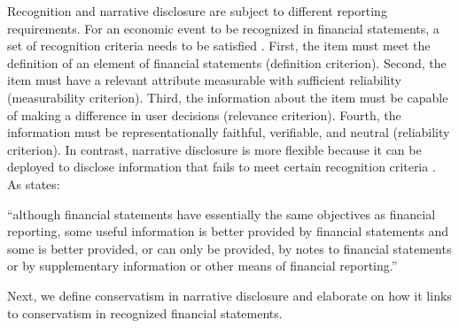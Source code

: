 \documentclass[letterpaper,12pt]{article}
\begin{document}
\begin{spacing}{1.5}
Recognition and narrative disclosure are subject to different reporting requirements. For an economic event to be recognized in financial statements, a set of recognition criteria needs to be satisfied \cite{fasbStatementFinancialAccounting1984}. First, the item must meet the definition of an element of financial statements (definition criterion). Second, the item must have a relevant attribute measurable with sufficient reliability (measurability criterion). Third, the information about the item must be capable of making a difference in user decisions (relevance criterion). Fourth, the information must be representationally faithful, verifiable, and neutral (reliability criterion). In contrast, narrative disclosure is more flexible because it can be deployed to disclose information that fails to meet certain recognition criteria \cite[par. 7b]{fasbStatementFinancialAccounting1984}. As  states:
\begin{adjustwidth}{0.8cm}{0.4cm}
	\begin{singlespace}
		``although financial statements have essentially the same objectives as financial reporting, some useful information is better provided by financial statements and some is better provided, or can only be provided, by notes to financial statements or by supplementary information or other means of financial reporting.''
	\end{singlespace}
\end{adjustwidth}

Next, we define conservatism in narrative disclosure and elaborate on how it links to conservatism in recognized financial statements.


\end{spacing}
\end{document}
